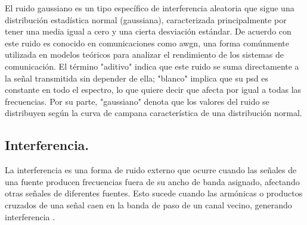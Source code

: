 \begin{justify}
    El ruido gaussiano es un tipo específico de interferencia aleatoria que sigue una distribución estadística normal (gaussiana),
    caracterizada principalmente por tener una media igual a cero y una cierta desviación estándar. De acuerdo con \textcite{carlson2010communication} este ruido es conocido en comunicaciones como \gls{awgn}, una forma
    comúnmente utilizada en modelos teóricos para analizar el rendimiento de los sistemas de comunicación.
    El término "aditivo" indica que este ruido se suma directamente a la señal transmitida sin depender de ella; "blanco" implica que su \gls{psd} es constante
    en todo el espectro, lo que quiere decir que afecta por igual a todas las frecuencias. Por su parte, "gaussiano" denota que los valores del ruido se distribuyen
    según la curva de campana característica de una distribución normal.
\end{justify}

\subsection*{\fontsize{12}{18}\selectfont Interferencia.}

\begin{justify}
    La interferencia es una forma de ruido externo que ocurre cuando las señales de una fuente producen frecuencias fuera de su ancho de banda asignado,
    afectando otras señales de diferentes fuentes. Esto sucede cuando las armónicas o productos cruzados de una señal caen en la banda de paso de un canal vecino,
    generando interferencia \parencite{tomasi2003sistemas}.
\end{justify}